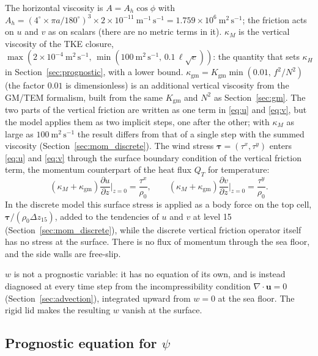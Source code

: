 \documentclass{article}
\begin{document}
The horizontal viscosity is $A = A_h\cos\phi$ with $A_h = (4^\circ\times\pi a/180^\circ)^3 \times 2\times10^{-11}~\text{m}^{-1}\,\text{s}^{-1} = 1.759\times10^6~\text{m}^2\,\text{s}^{-1}$; the friction acts on $u$ and $v$ as on scalars (there are no metric terms in it).
$\kappa_M$ is the vertical viscosity of the TKE closure, $\max(2\times10^{-4}~\text{m}^2\,\text{s}^{-1},\, \min(100~\text{m}^2\,\text{s}^{-1},\, 0.1\,\ell\sqrt{e}))$: the quantity that sets $\kappa_H$ in Section~\ref{sec:prognostic}, with a lower bound.
$\kappa_\text{gm} = K_\text{gm}\min(0.01,\, f^2/N^2)$ (the factor $0.01$ is dimensionless) is an additional vertical viscosity from the GM/TEM formalism, built from the same $K_\text{gm}$ and $N^2$ as Section~\ref{sec:gm}.
The two parts of the vertical friction are written as one term in \eqref{eq:u} and \eqref{eq:v}, but the model applies them as two implicit steps, one after the other; with $\kappa_M$ as large as $100~\text{m}^2\,\text{s}^{-1}$ the result differs from that of a single step with the summed viscosity (Section~\ref{sec:mom_discrete}).
The wind stress $\boldsymbol\tau = (\tau^x, \tau^y)$ enters \eqref{eq:u} and \eqref{eq:v} through the surface boundary condition of the vertical friction term, the momentum counterpart of the heat flux $Q_T$ for temperature:
\[
(\kappa_M+\kappa_\text{gm})\frac{\partial u}{\partial z}\bigg|_{z=0} = \frac{\tau^x}{\rho_0},
\qquad
(\kappa_M+\kappa_\text{gm})\frac{\partial v}{\partial z}\bigg|_{z=0} = \frac{\tau^y}{\rho_0}.
\]
In the discrete model this surface stress is applied as a body force on the top cell, $\boldsymbol\tau/(\rho_0\Delta z_{15})$, added to the tendencies of $u$ and $v$ at level 15 (Section~\ref{sec:mom_discrete}), while the discrete vertical friction operator itself has no stress at the surface.
There is no flux of momentum through the sea floor, and the side walls are free-slip.

$w$ is not a prognostic variable: it has no equation of its own, and is instead diagnosed at every time step from the incompressibility condition $\nabla\cdot\mathbf{u}=0$ (Section~\ref{sec:advection}), integrated upward from $w=0$ at the sea floor. The rigid lid makes the resulting $w$ vanish at the surface.

\subsection{\texorpdfstring{Prognostic equation for $\psi$}{Prognostic equation for psi}}\label{sec:psi}
\end{document}
